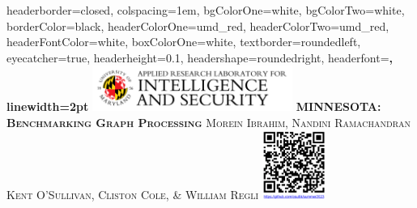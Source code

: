 \documentclass[landscape,a0paper,fontscale=0.285]{baposter} %
\begin{document}
\begin{poster}
{
headerborder=closed, %
colspacing=1em, %
bgColorOne=white, %
bgColorTwo=white, %
borderColor=black, %
headerColorOne=umd_red, %
headerColorTwo=umd_red, %
headerFontColor=white, %
boxColorOne=white, %
textborder=roundedleft, %
eyecatcher=true, %
headerheight=0.1\textheight, %
headershape=roundedright, %
headerfont=\Large\bf\textsc, %
linewidth=2pt %
}
%
{\includegraphics[height=4em]{arlis.png}} %
{\bf\textsc{MINNESOTA: Benchmarking Graph Processing}\vspace{0.2em}} %
{\textsc{Morein Ibrahim, Nandini Ramachandran\\ \hspace{12pt} Kent O'Sullivan, Cliston Cole, \& William Regli}} %
{\includegraphics[height=6em]{qrcode.png}}



\end{poster}
\end{document}
